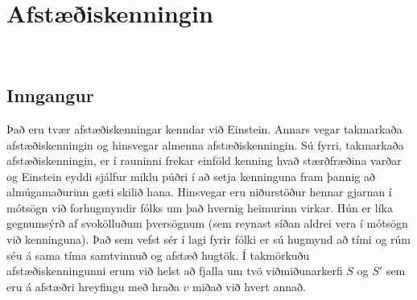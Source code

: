 \chapter{Afstæðiskenningin}


\begin{tcolorbox}

 \\

\vspace{-0.5cm}
\end{tcolorbox}

\section{Inngangur}

Það eru tvær afstæðiskenningar kenndar við Einstein. Annars vegar takmarkaða afstæðiskenningin og hinsvegar almenna afstæðiskenningin. Sú fyrri, takmarkaða afstæðiskenningin, er í rauninni frekar einföld kenning hvað stærðfræðina varðar og Einstein eyddi sjálfur miklu púðri í að setja kenninguna fram þannig að almúgamaðurinn gæti skilið hana. Hinsvegar eru niðurstöður hennar gjarnan í mótsögn við forhugmyndir fólks um það hvernig heimurinn virkar. Hún er líka gegnumsýrð af svokölluðum þversögnum (sem reynast síðan aldrei vera í mótsögn við kenninguna). Það sem vefst sér í lagi fyrir fólki er sú hugmynd að tími og rúm séu á sama tíma samtvinnuð og afstæð hugtök. Í takmörkuðu afstæðiskenningunni erum við helst að fjalla um tvö viðmiðunarkerfi $S$ og $S'$ sem eru á afstæðri hreyfingu með hraða $v$ miðað við hvert annað. \\

\setcounter{theorem}{1}

